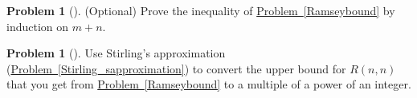 \documentclass[10pt,]{book}
\theoremstyle{plain}
\theoremstyle{definition}
\newtheorem{activity}[project]{Problem}
\theoremstyle{definition}
\numberwithin{equation}{chapter}
\begin{document}
\begin{activity}[]\marginsymbol[-1em]{} \label{activity-84}
\hypertarget{p-512}{}%
(Optional) Prove the inequality of \hyperref[Ramseybound]{Problem~\ref{Ramseybound}} by induction on \(m+n\).%
\end{activity}
\begin{activity}[]\marginsymbol[-1em]{} \label{activity-85}
\hypertarget{p-515}{}%
Use Stirling's approximation (\hyperref[Stirling_sapproximation]{Problem~\ref{Stirling_sapproximation}}) to convert the upper bound for \(R(n,n)\) that you get from \hyperref[Ramseybound]{Problem~\ref{Ramseybound}} to a multiple of a power of an integer.%
\end{activity}
\typeout{************************************************}
\typeout{************************************************}
\end{document}
